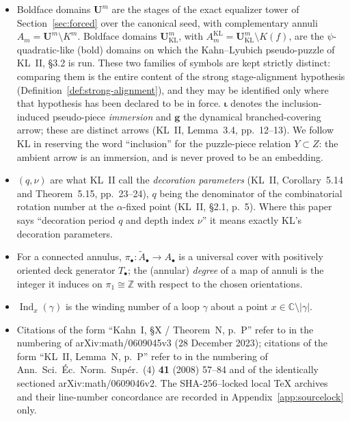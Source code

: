 \begin{itemize}
      the images of the fundamental groups of deleted local
      neighborhoods of the marked continuum \(A\)
      (Kahn~I, \S7.4.1, Theorem~7.12, p.~44).  Kahn requires of a local
      neighborhood only that every component of its complement of \(A\)
      be an annulus; the specialization to \emph{Jordan} neighborhoods
      made in this paper is our own, and is justified by
      Lemma~\ref{lem:local-pair}.
\item Boldface domains \(\mathbf U^m\) are the stages of the exact
      equalizer tower of Section~\ref{sec:forced} over the canonical
      seed, with complementary annuli
      \(A_m=\mathbf U^m\setminus K^m\).  Boldface domains
      \(\mathbf U_{\mathrm{KL}}^m\), with
      \(A^{\mathrm{KL}}_m=\mathbf U_{\mathrm{KL}}^m\setminus K(f)\),
      are the \(\psi\)-quadratic-like (bold) domains on which the
      Kahn--Lyubich pseudo-puzzle of KL~II, \S3.2 is run.  These two
      families of symbols are kept strictly distinct: comparing them is
      the entire content of the strong stage-alignment hypothesis
      (Definition~\ref{def:strong-alignment}), and they may be
      identified only where that hypothesis has been declared to be in
      force.  \(\boldsymbol\iota\) denotes
      the inclusion-induced pseudo-piece \emph{immersion} and
      \(\mathbf g\) the
      dynamical branched-covering arrow; these are distinct arrows
      (KL~II, Lemma~3.4, pp.~12--13).  We follow KL in reserving the
      word ``inclusion'' for the puzzle-piece relation \(Y\subset Z\):
      the ambient arrow is an immersion, and is never proved to be an
      embedding.
\item \((q,\nu)\) are what KL~II call the \emph{decoration parameters}
      (KL~II, Corollary~5.14 and Theorem~5.15, pp.~23--24), \(q\) being
      the denominator of the combinatorial rotation number at the
      \(\alpha\)-fixed point (KL~II, \S2.1, p.~5).  Where this paper
      says ``decoration period \(q\) and depth index \(\nu\)'' it means
      exactly KL's decoration parameters.
\item For a connected annulus, \(\pi_\bullet:\widetilde A_\bullet\to
      A_\bullet\) is a universal cover with positively oriented deck
      generator \(T_\bullet\); the (annular) \emph{degree} of a map of
      annuli is the integer it induces on \(\pi_1\cong\mathbb Z\) with
      respect to the chosen orientations.
\item \(\operatorname{Ind}_x(\gamma)\) is the winding number of a loop
      \(\gamma\) about a point \(x\in\mathbb C\setminus|\gamma|\).
\item Citations of the form ``Kahn~I, \S X / Theorem~N, p.~P'' refer to
      \cite{KahnPrimitive06} in the numbering of arXiv:math/0609045v3
      (28 December 2023); citations of the form ``KL~II, Lemma~N,
      p.~P'' refer to \cite{KLDecorations08} in the numbering of
      Ann.\ Sci.\ \'Ec.\ Norm.\ Sup\'er.\ (4) \textbf{41} (2008)
      57--84 and of the identically sectioned arXiv:math/0609046v2.
      The SHA-256--locked local \TeX{} archives and their line-number
      concordance are recorded in Appendix~\ref{app:sourcelock} only.
\end{itemize}